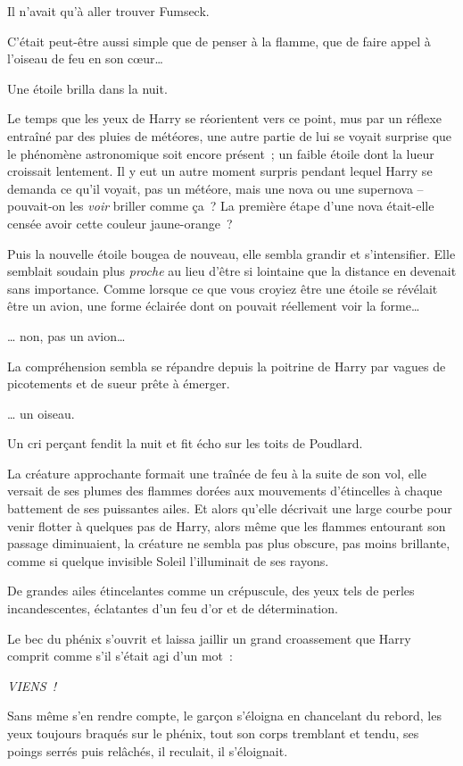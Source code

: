 Il n'avait qu'à aller trouver Fumseck.

C'était peut-être aussi simple que de penser à la flamme, que de faire appel à l'oiseau de feu en son cœur…

Une étoile brilla dans la nuit.

Le temps que les yeux de Harry se réorientent vers ce point, mus par un réflexe entraîné par des pluies de météores, une autre partie de lui se voyait surprise que le phénomène astronomique soit encore présent~; un faible étoile dont la lueur croissait lentement. Il y eut un autre moment surpris pendant lequel Harry se demanda ce qu'il voyait, pas un météore, mais une nova ou une supernova -- pouvait-on les \emph{voir} briller comme ça~? La première étape d'une nova était-elle censée avoir cette couleur jaune-orange~?

Puis la nouvelle étoile bougea de nouveau, elle sembla grandir et s'intensifier. Elle semblait soudain plus \emph{proche} au lieu d'être si lointaine que la distance en devenait sans importance. Comme lorsque ce que vous croyiez être une étoile se révélait être un avion, une forme éclairée dont on pouvait réellement voir la forme…

… non, pas un avion…

La compréhension sembla se répandre depuis la poitrine de Harry par vagues de picotements et de sueur prête à émerger.

… un oiseau.

Un cri perçant fendit la nuit et fit écho sur les toits de Poudlard.

La créature approchante formait une traînée de feu à la suite de son vol, elle versait de ses plumes des flammes dorées aux mouvements d'étincelles à chaque battement de ses puissantes ailes. Et alors qu'elle décrivait une large courbe pour venir flotter à quelques pas de Harry, alors même que les flammes entourant son passage diminuaient, la créature ne sembla pas plus obscure, pas moins brillante, comme si quelque invisible Soleil l'illuminait de ses rayons.

De grandes ailes étincelantes comme un crépuscule, des yeux tels de perles incandescentes, éclatantes d'un feu d'or et de détermination.

Le bec du phénix s'ouvrit et laissa jaillir un grand croassement que Harry comprit comme s'il s'était agi d'un mot~:

\emph{VIENS~!}

Sans même s'en rendre compte, le garçon s'éloigna en chancelant du rebord, les yeux toujours braqués sur le phénix, tout son corps tremblant et tendu, ses poings serrés puis relâchés, il reculait, il s'éloignait.

